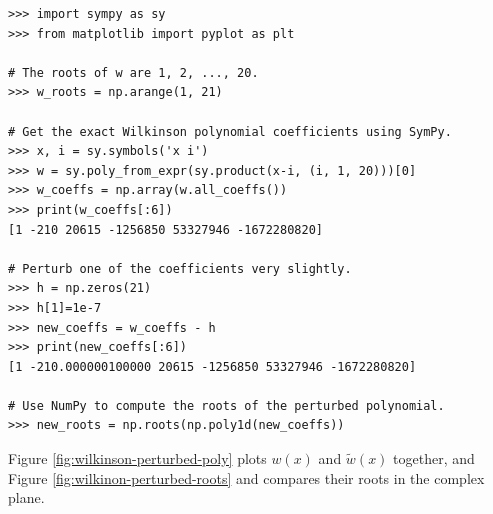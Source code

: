 \begin{lstlisting}
>>> import sympy as sy
>>> from matplotlib import pyplot as plt

# The roots of w are 1, 2, ..., 20.
>>> w_roots = np.arange(1, 21)

# Get the exact Wilkinson polynomial coefficients using SymPy.
>>> x, i = sy.symbols('x i')
>>> w = sy.poly_from_expr(sy.product(x-i, (i, 1, 20)))[0]
>>> w_coeffs = np.array(w.all_coeffs())
>>> print(w_coeffs[:6])
[1 -210 20615 -1256850 53327946 -1672280820]

# Perturb one of the coefficients very slightly.
>>> h = np.zeros(21)
>>> h[1]=1e-7
>>> new_coeffs = w_coeffs - h
>>> print(new_coeffs[:6])
[1 -210.000000100000 20615 -1256850 53327946 -1672280820]

# Use NumPy to compute the roots of the perturbed polynomial.
>>> new_roots = np.roots(np.poly1d(new_coeffs))
\end{lstlisting}

Figure \ref{fig:wilkinson-perturbed-poly} plots $w(x)$ and $\tilde{w}(x)$ together, and Figure \ref{fig:wilkinon-perturbed-roots} and compares their roots in the complex plane.

